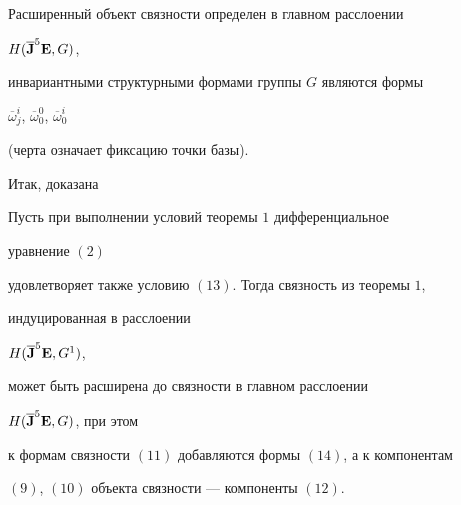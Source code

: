 Расширенный объект связности определен в главном расслоении 


$H(\overline{\bold J}^5\bold E,G)$, 


инвариантными структурными формами группы $G$ являются формы 


$\overline\omega^i_j$, $\overline\omega^0_0$, $\overline\omega^i_0$ 


(черта означает фиксацию точки базы). 


 


Итак, доказана 


 


\begin{thm} Пусть при выполнении условий теоремы $1$ дифференциальное 


уравнение $(2)$ 


удовлетворяет также условию $(13)$. Тогда связность из теоремы $1$,  


индуцированная в расслоении 


$H(\overline{\bold J}^5\bold E,G^1)$, 


может быть расширена до связности в главном расслоении 


$H(\overline{\bold J}^5\bold E,G)$, при этом 


к формам связности $(11)$ добавляются формы $(14)$, а к компонентам 


$(9)$, $(10)$ объекта связности --- компоненты $(12)$. 


\end{thm} 


 


